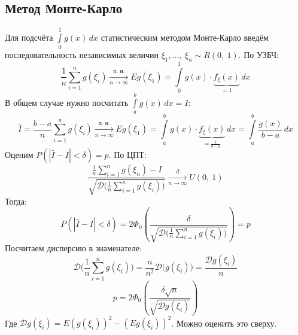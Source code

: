 \documentclass[12pt, a4paper]{article}
\begin{document}
    \subsection*{Метод Монте-Карло}
    Для подсчёта $\displaystyle\int\limits_0^1 g(x)\, dx$ статистическим методом Монте-Карло введём последовательность независимых величин $\xi_1,\dots,\ \xi_n \sim R(0,\ 1)$. По УЗБЧ:
    \[\frac{1}{n} \sum_{i = 1}^{n} g(\xi_i) \xrightarrow[n\to \infty]{\text{п. н.}} Eg(\xi_1) = \int\limits_0^1 g(x)\cdot \underset{=1}{\underbrace{f_{\xi}(x)}}\, dx\]
    В общем случае нужно посчитать $\displaystyle \int\limits_a^b g(x)\, dx = I$:
    \[\hat{I} = \frac{b - a}{n} \sum_{i = 1}^{n} g(\xi_i) \xrightarrow[n\to \infty]{\text{п. н.}} Eg(\xi_1) = \int\limits_a^b g(x)\cdot \underset{=\frac{1}{b - a}}{\underbrace{f_{\xi}(x)}}\, dx = \int\limits_a^b \frac{g(x)}{b - a}\, dx\]
    Оценим $P(|\hat{I} - I| < \delta) = p$. По ЦПТ:
    \[\frac{\frac{1}{n} \sum_{i = 1}^{n} g(\xi_n) - I}{\sqrt{\mathcal{D} \big(\frac{1}{n} \sum_{i  =1}^{n} g(\xi_i)\big)}} \xrightarrow[n\to \infty]{d} U(0,\ 1)\]
    Тогда:
    \[P(|\hat{I} - I| < \delta) = 2\Phi_0\left( \frac{\delta}{\sqrt{\mathcal{D}\big( \frac{1}{n} \sum_{i =1}^{n} g(\xi_i) \big)}} \right) = p\]
    Посчитаем дисперсию в знаменателе:
    \[\mathcal{D}\big( \frac{1}{n} \sum_{i =1}^{n} g(\xi_i) \big) = \frac{n}{n^2} \mathcal{D}\big(g(\xi_i)\big) = \frac{\mathcal{D}g(\xi_i)}{n}\]
    \[p = 2\Phi_0\left(\frac{\delta \sqrt{n}}{\sqrt{\mathcal{D} g(\xi_i)}}\right)\]
    Где $\mathcal{D}g(\xi_i) = E(g(\xi_i))^2 - (Eg(\xi_i))^2$. Можно оценить это сверху. 
\end{document}

